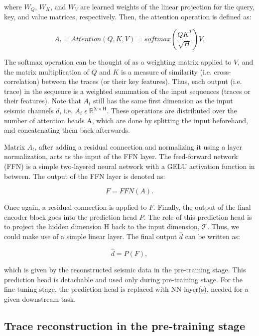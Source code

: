 \documentclass{article}
\newcommand\Tau{\mathcal{T}}
\begin{document}
where $W_Q$, $W_K$, and $W_V$ are learned weights of the linear projection for the query, key, and value matrices, respectively. Then, the attention operation is defined as:

\begin{equation}
    \label{eq:eq4}
    A_t = Attention(Q, K, V) = softmax\left(\frac{QK^T}{\sqrt{H}}\right)V.
\end{equation}

 The softmax operation can be thought of as a weighting matrix applied to $V$, and the matrix multiplication of $Q$ and $K$ is a measure of similarity (i.e. cross-correlation) between the traces (or their key features). Thus, each output (i.e. trace) in the sequence is a weighted summation of the input sequences (traces or their features). Note that $A_t$ still has the same first dimension as the input seismic channels $d$, i.e. $A_t\;\epsilon\;\mathbb{R}^{\mathrm{X} \times \mathrm{H}}$. These operations are distributed over the number of attention heads A, which are done by splitting the input beforehand, and concatenating them back afterwards.

Matrix $A_t$, after adding a residual connection and normalizing it using a layer normalization, acts as the input of the FFN layer. The feed-forward network (FFN) is a simple two-layered neural network with a GELU activation function in between. The output of the FFN layer is denoted as:

\begin{equation}
    \label{eq:eq5}
    F = FFN(A).
\end{equation}

Once again, a residual connection is applied to $F$. Finally, the output of the final encoder block goes into the prediction head $P$. The role of this prediction head is to project the hidden dimension H back to the input dimension, $\Tau$. Thus, we could make use of a simple linear layer. The final output $\hat{d}$ can be written as:

\begin{equation}
    \label{eq:eq6}
    \hat{d} = P(F),
\end{equation}

which is given by the reconstructed seismic data in the pre-training stage. This prediction head is detachable and used only during pre-training stage. For the fine-tuning stage, the prediction head is replaced with NN layer(s), needed for a given downstream task.
 
\subsection{Trace reconstruction in the pre-training stage}
\end{document}
